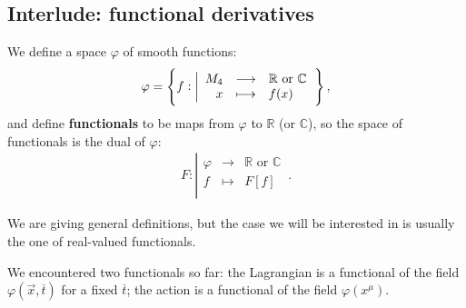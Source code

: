 \documentclass[main.tex]{subfiles}
\begin{document}
\subsection{Interlude: functional derivatives}

We define a space \(\varphi \) of smooth functions: 
%
\begin{align}
\varphi = \qty{
 f:
\left|
  \begin{array}{rcl}
    M_{4} & \longrightarrow & \mathbb{R} \text{ or } \mathbb{C} \\
    x & \longmapsto & f(x) \\
  \end{array}
\right.
}
\,,
\end{align}
%
and define \textbf{functionals} to be maps from \(\varphi \) to \(\mathbb{R}\) (or \(\mathbb{C}\)), so the space of functionals is the dual of \(\varphi \): 
%
\begin{align}
 F:
\left|
  \begin{array}{rcl}
    \varphi  & \longrightarrow & \mathbb{R} \text{ or } \mathbb{C}   \\
    f & \longmapsto & F[f] \\
  \end{array}
\right.
\,.
\end{align}

We are giving general definitions, but the case we will be interested in is usually the one of real-valued functionals.

We encountered two functionals so far: the Lagrangian is a functional of the field \(\varphi (\vec{x}, \overline{t})\) for a fixed \(\overline{t}\); the action is a functional of the field \(\varphi (x^{\mu })\).
\end{document}
